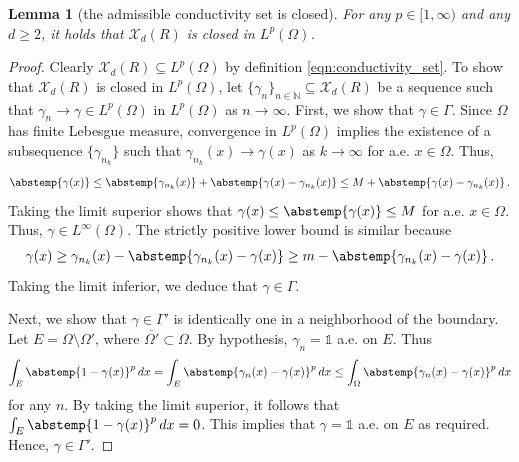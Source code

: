 \documentclass[pdflatex,sn-mathphys-num]{sn-jnl-preprint}
\newcommand{\N}{\mathbb{N}}
\newcommand{\cX}{\mathcal{X}}
\newcommand{\abs}{\abstemp}
\newcommand{\diff}{d}
\newcommand{\dd}[1]{\,\diff{#1}}
\newcommand{\onebm}{\mathds{1}} %
\theoremstyle{thmstyleone}%
\newtheorem{lemma}[theorem]{Lemma}%
\theoremstyle{thmstyletwo}%
\theoremstyle{thmstylethree}%
\numberwithin{equation}{section}
\numberwithin{theorem}{section}
\begin{document}
\begin{lemma}[the admissible conductivity set is closed]\label{lem:closed_set}
    For any $p\in[1,\infty)$ and any $d\geq 2$, it holds that $\cX_d(R)$ is closed in $L^p(\Omega)$.
\end{lemma}
\begin{proof}
    Clearly $\cX_d(R)\subseteq L^p(\Omega)$ by definition \eqref{eqn:conductivity_set}. To show that $\cX_d(R)$ is closed in $L^p(\Omega)$, let $\{\gamma_n\}_{n\in\N}\subseteq \cX_d(R)$ be a sequence such that $\gamma_n\to\gamma\in L^p(\Omega)$ in $L^p(\Omega)$ as $n\to\infty$. First, we show that $\gamma\in\Gamma$. Since $\Omega$ has finite Lebesgue measure, convergence in $L^p(\Omega)$ implies the existence of a subsequence $\{\gamma_{n_k}\}$ such that $\gamma_{n_k}(x)\to\gamma(x)$ as $k\to\infty$ for a.e. $x\in\Omega$. Thus,
    \begin{align*}
        \abs{\gamma(x)}\leq \abs{\gamma_{n_k}(x)} + \abs{\gamma(x)-\gamma_{n_k}(x)}
        \leq M + \abs{\gamma(x)-\gamma_{n_k}(x)}\,.
    \end{align*}
    Taking the limit superior shows that $\gamma(x)\leq\abs{\gamma(x)}\leq M$ for a.e. $x\in\Omega$. Thus, $\gamma\in L^\infty(\Omega)$. The strictly positive lower bound is similar because
    \begin{align*}
        \gamma(x)\geq \gamma_{n_k}(x) - \abs{\gamma_{n_k}(x)-\gamma(x)}
        \geq m - \abs{\gamma_{n_k}(x)-\gamma(x)}\,.
    \end{align*}
    Taking the limit inferior, we deduce that $\gamma\in\Gamma$.
    
    Next, we show that $\gamma\in \Gamma'$ is identically one in a neighborhood of the boundary. Let $E=\Omega\setminus\Omega'$, where $\overline{\Omega'}\subset\Omega$. By hypothesis, $\gamma_n=\onebm$ a.e. on $E$. Thus
    \begin{align*}
        \int_E\abs{1-\gamma(x)}^p\dd{x}=\int_E\abs{\gamma_n(x)-\gamma(x)}^p\dd{x}\leq\int_\Omega\abs{\gamma_n(x)-\gamma(x)}^p\dd{x}
    \end{align*}
    for any $n$. By taking the limit superior, it follows that $\int_E\abs{1-\gamma(x)}^p\dd{x}=0$. This implies that $\gamma=\onebm$ a.e. on $E$ as required. Hence, $\gamma\in\Gamma'$.


\end{proof}
\end{document}
